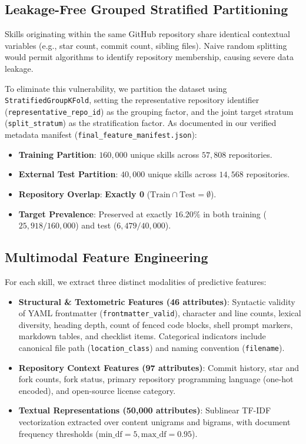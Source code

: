 \documentclass[12pt]{article}
\begin{document}
\subsection{Leakage-Free Grouped Stratified Partitioning}
Skills originating within the same GitHub repository share identical contextual variables (e.g., star count, commit count, sibling files). Naive random splitting would permit algorithms to identify repository membership, causing severe data leakage. 

To eliminate this vulnerability, we partition the dataset using \texttt{StratifiedGroupKFold}, setting the representative repository identifier (\texttt{representative\_repo\_id}) as the grouping factor, and the joint target stratum (\texttt{split\_stratum}) as the stratification factor. As documented in our verified metadata manifest (\texttt{final\_feature\_manifest.json}):
\begin{itemize}
    \item \textbf{Training Partition}: $160,000$ unique skills across $57,808$ repositories.
    \item \textbf{External Test Partition}: $40,000$ unique skills across $14,568$ repositories.
    \item \textbf{Repository Overlap}: \textbf{Exactly 0} ($\text{Train} \cap \text{Test} = \emptyset$).
    \item \textbf{Target Prevalence}: Preserved at exactly $16.20\%$ in both training ($25,918 / 160,000$) and test ($6,479 / 40,000$).
\end{itemize}

\subsection{Multimodal Feature Engineering}
For each skill, we extract three distinct modalities of predictive features:
\begin{itemize}
    \item \textbf{Structural \& Textometric Features (46 attributes)}: Syntactic validity of YAML frontmatter (\texttt{frontmatter\_valid}), character and line counts, lexical diversity, heading depth, count of fenced code blocks, shell prompt markers, markdown tables, and checklist items. Categorical indicators include canonical file path (\texttt{location\_class}) and naming convention (\texttt{filename}).
    \item \textbf{Repository Context Features (97 attributes)}: Commit history, star and fork counts, fork status, primary repository programming language (one-hot encoded), and open-source license category.
    \item \textbf{Textual Representations (50,000 attributes)}: Sublinear TF-IDF vectorization extracted over content unigrams and bigrams, with document frequency thresholds ($\text{min\_df}=5, \text{max\_df}=0.95$).
\end{itemize}
\end{document}
